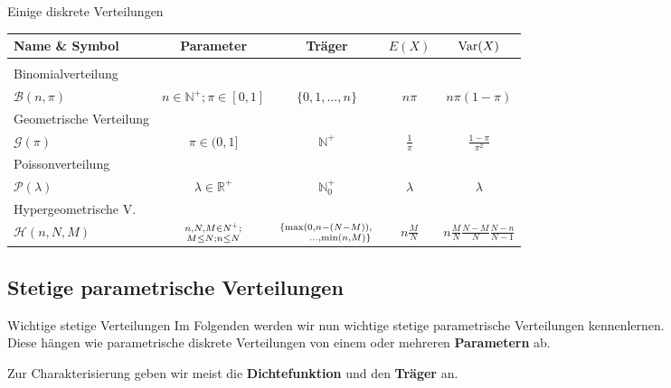 \documentclass[
  10pt,
  ignorenonframetext,
]{beamer}
\begin{document}
\begin{frame}{Einige diskrete Verteilungen}
\protect\hypertarget{einige-diskrete-verteilungen}{}
\small
\begin{center}
\begin{tabular}{l|c c c c}
Name \& Symbol 
& Parameter
& Träger
& $E(X)$
& $\operatorname{Var}(X)$ \\
\hline
\\
Binomialverteilung\\
$ {\mathcal B}(n, \pi)$
& $n \in \mathbb N^+; \pi \in [0,1]$
& $\{0, 1, \dots, n\}$
& $n \pi$
& $n \pi (1 - \pi)$\\[1.5em]

Geometrische Verteilung\\
$ \mathcal{G}(\pi) $
& $\pi \in (0,1]$
& $\mathbb N^+$ 
& $\frac{1}{\pi}$
& $\frac{1 - \pi}{\pi^2}$\\[1.5em]

Poissonverteilung\\
$\mathcal{P}(\lambda)$
& $\lambda \in \mathbb R^+$
& $\mathbb N^+_0$ 
& $\lambda$
& $\lambda$\\[1.5em]

Hypergeometrische V. \\
$\mathcal{H}(n, N, M)$
& { ${n, N, M \in N^+;}\atop{M \leq N; n \leq N}$}
& { ${\left\{\max\left(0, n - (N - M)\right),\right.}\atop{\qquad\left. ..., \min\left(n, M\right)\right\}}$}
& $n\tfrac{M}{N}$
& $n\tfrac{M}{N}\tfrac{N-M}{N}\tfrac{N-n}{N-1}$\\[1.5em]

\end{tabular}
\end{center}
\end{frame}

\hypertarget{stetige-parametrische-verteilungen}{%
\subsection{Stetige parametrische
Verteilungen}\label{stetige-parametrische-verteilungen}}

\begin{frame}{Wichtige stetige Verteilungen}
\protect\hypertarget{wichtige-stetige-verteilungen}{}
Im Folgenden werden wir nun wichtige stetige parametrische Verteilungen
kennenlernen.\\
Diese hängen wie parametrische diskrete Verteilungen von einem oder
mehreren \textbf{Parametern} ab.

Zur Charakterisierung geben wir meist die \textbf{Dichtefunktion} und
den \textbf{Träger} an.
\end{frame}
\end{document}
